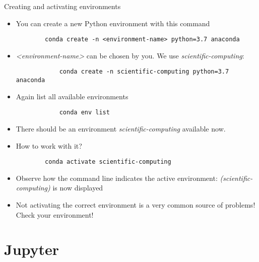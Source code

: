 \begin{frame}[fragile]{Creating and activating environments}

	\begin{itemize}
		\item You can create a new Python environment with this command
		\begin{verbatim}
		conda create -n <environment-name> python=3.7 anaconda
		\end{verbatim}

		\item \textit{<environment-name>} can be chosen by you. We use \textit{scientific-computing}:
		\begin{verbatim}
			conda create -n scientific-computing python=3.7 anaconda

		\end{verbatim}

		\item Again list all available environments
			\begin{verbatim}
			conda env list
			\end{verbatim}
		\item There should be an environment \textit{scientific-computing} available now.
		\item How to work with it?
		\begin{verbatim}
		conda activate scientific-computing
		\end{verbatim}
		\item Observe how the command line indicates the active environment:
            \textit{(scientific-computing)} is now displayed
		\item Not activating the correct environment is a very common source of problems! Check your environment!

	\end{itemize}

\end{frame}


\section{Jupyter}

